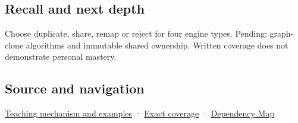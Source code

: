 \subsection{Recall and next depth}\label{appendix-1340cd1ce582-recall-and-next-depth}

Choose duplicate, share, remap or reject for four engine types. Pending: graph-clone algorithms and immutable shared ownership. Written coverage does not demonstrate personal mastery.

\subsection{Source and navigation}\label{appendix-1340cd1ce582-source-and-navigation}

\hyperref[01-foundations-i-ch003-copy-a-meaning-rather-than-just-its-bytes]{Teaching mechanism and examples} · \hyperref[appendix-fd090d982a15-m009---parts-127-147]{Exact coverage} · \hyperref[appendix-4ad47bdd269a]{Dependency Map}
